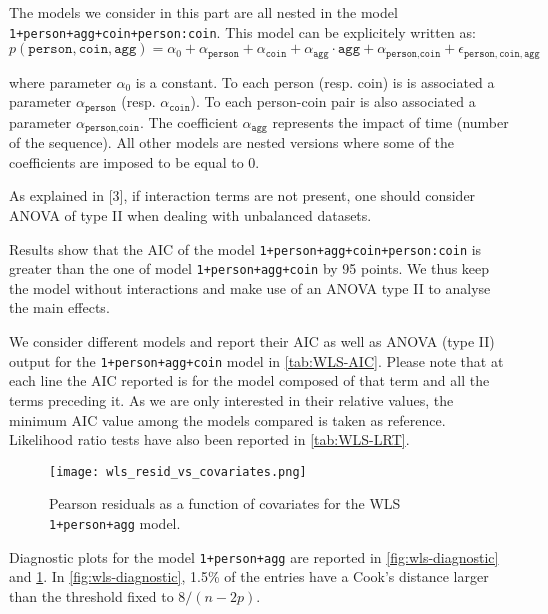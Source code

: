 \documentclass[a4paper, 12pt,oneside]{article}
\begin{document}
			The models we consider in this part are all nested in the model \texttt{1+person+agg+coin+person:coin}.
			This model can be explicitely written as: 
			\begin{equation}
				\label{eq:wls_model}
				p(\texttt{person},\texttt{coin},\texttt{agg}) = \alpha_0 + \alpha_{\texttt{person}}+\alpha_{\texttt{coin}} +\alpha_{\texttt{agg}}\cdot\texttt{agg} +\alpha_{\texttt{person},\texttt{coin}} + \epsilon_{\texttt{person},\texttt{coin},\texttt{agg}}
			\end{equation}

			where parameter $\alpha_0$ is a constant. To each person (resp. coin) is is associated a parameter
			$\alpha_{\texttt{person}}$ (resp. $\alpha_{\texttt{coin}}$). To each person-coin pair is also associated a parameter $\alpha_{\texttt{person},\texttt{coin}}$. The coefficient $\alpha_{\texttt{agg}}$ represents the impact of time (number of the sequence). All other models are nested versions where some of the coefficients are imposed to be equal to 0.


			
			As explained in [3], if interaction terms are not present, one should consider ANOVA of type II when dealing with unbalanced datasets.

			Results show that the AIC of the model \texttt{1+person+agg+coin+person:coin} is greater than the one of model \texttt{1+person+agg+coin} by 95 points. We thus keep the model without interactions and make use of an ANOVA type II to analyse the main effects. 

			We consider different models and report their AIC as well as  ANOVA (type II) output for the \texttt{1+person+agg+coin} model in \ref{tab:WLS-AIC}. Please note that at each line the AIC reported is for the model composed of that term and all the terms preceding it. As we are only interested in their relative values, the minimum AIC value among the models compared is taken as reference. 
			Likelihood ratio tests have also been reported in \ref{tab:WLS-LRT}.
			\begin{figure}[htb]
				\vspace{-1em}
				\centering
				\texttt{[image: wls\_resid\_vs\_covariates.png]}
				\caption{Pearson residuals as a function of covariates for the WLS \texttt{1+person+agg} model.}
				\label{fig:wls-diagnostic-time-coefs}
			\end{figure}

			Diagnostic plots for the model \texttt{1+person+agg} are reported in \ref{fig:wls-diagnostic} and \ref{fig:wls-diagnostic-time-coefs}. In \ref{fig:wls-diagnostic}, 1.5\% of the entries have a Cook's distance larger than the threshold fixed to $8/(n-2p)$. 
\end{document}
